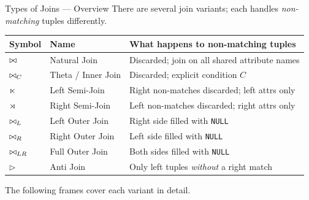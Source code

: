 \begin{frame}{Types of Joins --- Overview}
  There are several join variants; each handles \emph{non-matching} tuples
  differently.

  \vspace{0.4em}
  \begin{center}
    \footnotesize
    \begin{tabular}{llp{5.5cm}}
      \toprule
      \textbf{Symbol} & \textbf{Name} & \textbf{What happens to non-matching tuples} \\
      \midrule
      $\bowtie$          & Natural Join       & Discarded; join on all shared attribute names \\
      $\bowtie_C$        & Theta / Inner Join & Discarded; explicit condition $C$ \\
      $\ltimes$          & Left Semi-Join     & Right non-matches discarded; left attrs only \\
      $\rtimes$          & Right Semi-Join    & Left non-matches discarded; right attrs only \\
      $\bowtie_L$        & Left Outer Join    & Right side filled with \texttt{NULL} \\
      $\bowtie_R$        & Right Outer Join   & Left side filled with \texttt{NULL} \\
      $\bowtie_{LR}$     & Full Outer Join    & Both sides filled with \texttt{NULL} \\
      $\triangleright$   & Anti Join          & Only left tuples \emph{without} a right match \\
      \bottomrule
    \end{tabular}
  \end{center}

  \vspace{0.4em}
  The following frames cover each variant in detail.
\end{frame}

